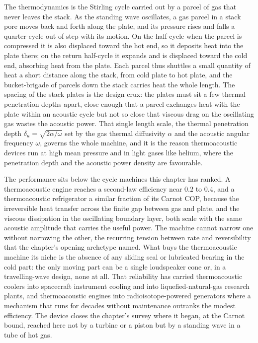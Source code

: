The thermodynamics is the Stirling cycle carried out by a parcel of gas that
never leaves the stack. As the standing wave oscillates, a gas parcel in a stack
pore moves back and forth along the plate, and its pressure rises and falls a
quarter-cycle out of step with its motion. On the half-cycle when the parcel is
compressed it is also displaced toward the hot end, so it deposits heat into the
plate there; on the return half-cycle it expands and is displaced toward the cold
end, absorbing heat from the plate. Each parcel thus shuttles a small quantity of
heat a short distance along the stack, from cold plate to hot plate, and the
bucket-brigade of parcels down the stack carries heat the whole length. The
spacing of the stack plates is the design crux: the plates must sit a few thermal
penetration depths apart, close enough that a parcel exchanges heat with the plate
within an acoustic cycle but not so close that viscous drag on the oscillating gas
wastes the acoustic power. That single length scale, the thermal penetration
depth $\delta_\kappa = \sqrt{2\alpha/\omega}$ set by the gas thermal diffusivity
$\alpha$ and the acoustic angular frequency $\omega$, governs the whole machine,
and it is the reason thermoacoustic devices run at high mean pressure and in
light gases like helium, where the penetration depth and the acoustic power
density are favourable.

The performance sits below the cycle machines this chapter has ranked. A
thermoacoustic engine reaches a second-law efficiency near $0.2$ to $0.4$, and a
thermoacoustic refrigerator a similar fraction of its Carnot COP, because the
irreversible heat transfer across the finite gap between gas and plate, and the
viscous dissipation in the oscillating boundary layer, both scale with the same
acoustic amplitude that carries the useful power. The machine cannot narrow one
without narrowing the other, the recurring tension between rate and reversibility
that the chapter's opening archetype named. What buys the thermoacoustic machine
its niche is the absence of any sliding seal or lubricated bearing in the cold
part: the only moving part can be a single loudspeaker cone or, in a
travelling-wave design, none at all. That reliability has carried thermoacoustic
coolers into spacecraft instrument cooling and into liquefied-natural-gas
research plants, and thermoacoustic engines into radioisotope-powered generators
where a mechanism that runs for decades without maintenance outranks the modest
efficiency. The device closes the chapter's survey where it began, at the Carnot
bound, reached here not by a turbine or a piston but by a standing wave in a tube
of hot gas.

